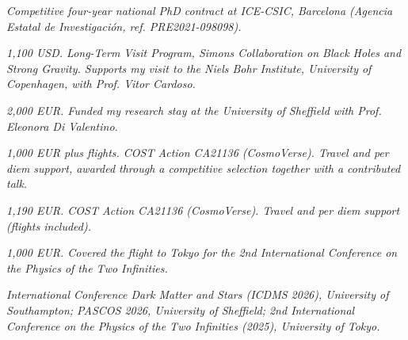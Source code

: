 \resumeSubHeadingListStart
{}
\begin{indentedtext}
\textit{Competitive four-year national PhD contract at ICE-CSIC, Barcelona (Agencia Estatal de Investigación, ref. PRE2021-098098).}
\end{indentedtext}
\resumeSubHeadingListEnd

\resumeSubHeadingListStart
{}
\begin{indentedtext}
\textit{1,100 USD. Long-Term Visit Program, Simons Collaboration on Black Holes and Strong Gravity. Supports my visit to the Niels Bohr Institute, University of Copenhagen, with Prof. Vitor Cardoso.}
\end{indentedtext}
\resumeSubHeadingListEnd

\resumeSubHeadingListStart
{}
\begin{indentedtext}
\textit{2,000 EUR. Funded my research stay at the University of Sheffield with Prof. Eleonora Di Valentino.}
\end{indentedtext}
\resumeSubHeadingListEnd

\resumeSubHeadingListStart
{}
\begin{indentedtext}
\textit{1,000 EUR plus flights. COST Action CA21136 (CosmoVerse). Travel and per diem support, awarded through a competitive selection together with a contributed talk.}
\end{indentedtext}
\resumeSubHeadingListEnd

\resumeSubHeadingListStart
{}
\begin{indentedtext}
\textit{1,190 EUR. COST Action CA21136 (CosmoVerse). Travel and per diem support (flights included).}
\end{indentedtext}
\resumeSubHeadingListEnd

\resumeSubHeadingListStart
{}
\begin{indentedtext}
\textit{1,000 EUR. Covered the flight to Tokyo for the 2nd International Conference on the Physics of the Two Infinities.}
\end{indentedtext}
\resumeSubHeadingListEnd

\resumeSubHeadingListStart
{}
\begin{indentedtext}
\textit{International Conference Dark Matter and Stars (ICDMS 2026), University of Southampton; PASCOS 2026, University of Sheffield; 2nd International Conference on the Physics of the Two Infinities (2025), University of Tokyo.}
\end{indentedtext}
\resumeSubHeadingListEnd
